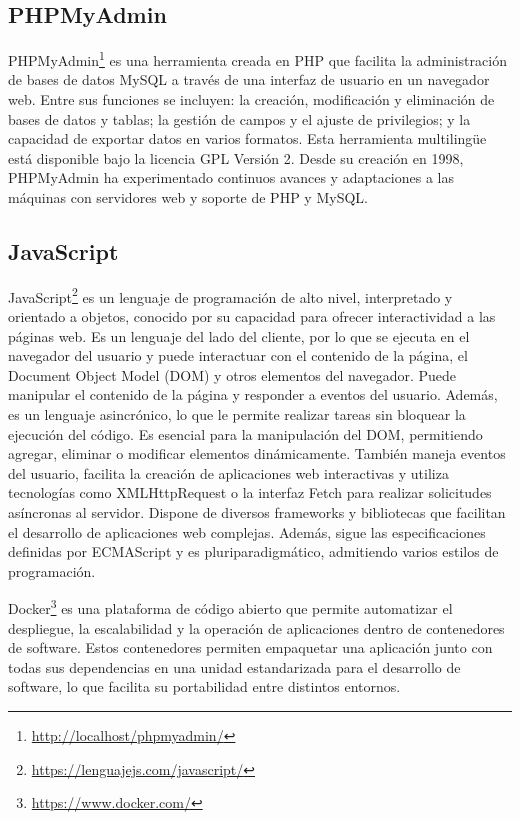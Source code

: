 \documentclass[a4paper, 12pt]{book}
\begin{document}
\subsection{PHPMyAdmin}
\label{subsec:phpmyadmin} PHPMyAdmin\footnote{\url{http://localhost/phpmyadmin/}} es una herramienta creada en PHP que facilita la administración de bases de datos 
MySQL a través de una interfaz de usuario en un navegador web. 
Entre sus funciones se incluyen: la creación, modificación y eliminación de bases de datos y tablas; la gestión de campos y el ajuste de privilegios; y la 
capacidad de exportar datos en varios formatos. Esta herramienta multilingüe está disponible bajo la licencia GPL Versión 2. Desde su creación en 1998, 
PHPMyAdmin ha experimentado continuos avances y adaptaciones a las máquinas con servidores web y soporte de PHP y MySQL.

\subsection{JavaScript}
\label{subsec:JavaScript} JavaScript\footnote{\url{https://lenguajejs.com/javascript/}} es un lenguaje de programación de alto nivel, interpretado y orientado a objetos, conocido por su capacidad para ofrecer 
interactividad a las páginas web. Es un lenguaje del lado del cliente, por lo que se ejecuta en el navegador del usuario y puede interactuar con el contenido 
de la página, el Document Object Model (DOM) y otros elementos del navegador. Puede manipular el contenido de la página y responder a eventos del usuario. 
Además, es un lenguaje asincrónico, lo que le permite realizar tareas sin bloquear la ejecución del código. Es esencial para la manipulación del DOM, permitiendo 
agregar, eliminar o modificar elementos dinámicamente. También maneja eventos del usuario, facilita la creación de aplicaciones web interactivas y utiliza 
tecnologías como XMLHttpRequest o la interfaz Fetch para realizar solicitudes asíncronas al servidor. Dispone de diversos frameworks y bibliotecas que facilitan 
el desarrollo de aplicaciones web complejas. Además, sigue las especificaciones definidas por ECMAScript y es pluriparadigmático, admitiendo varios estilos de 
programación.

Docker\footnote{\url{https://www.docker.com/}} es una plataforma de código abierto que permite automatizar el despliegue, la escalabilidad y la operación de 
aplicaciones dentro de contenedores de software. Estos contenedores permiten empaquetar una aplicación junto con todas sus dependencias en una unidad estandarizada 
para el desarrollo de software, lo que facilita su portabilidad entre distintos entornos.
\end{document}
